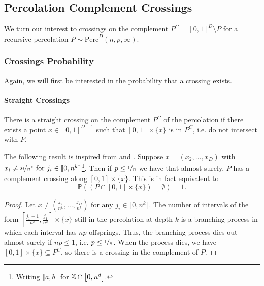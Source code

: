 
\subsection{Percolation Complement Crossings}
We turn our interest to crossings on the complement $P^C = \left[ 0,1 \right]^D \setminus P$ for a recursive percolation $P \sim \text{Perc}^D(n,p,\infty)$.

\subsubsection{Crossings Probability}
Again, we will first be interested in the probability that a crossing exists.

\paragraph{Straight Crossings}
There is a straight crossing on the complement $P^C$ of the percolation if there exists a point $x \in \left[ 0,1 \right]^{D-1}$ such that $\left[ 0,1 \right] \times \{ x \}$  is in $P^C$, i.e. do not intersect with $P$.

The following result is inspired from \cite[p.309 b.(1)]{Chayes_1988} and \cite[p.215]{Mandelbrot_1982}.
Suppose $x = (x_2,\dots,x_D)$ with $x_i \neq \nicefrac{j_i}{n^k} \text{ for } j_i \in \llbracket 0,n^k \rrbracket$\footnote{Writing $\llbracket a,b \rrbracket$ for $\mathbb{Z} \cap \left[ 0,n^d \right]$.}.
Then if $p \leq \nicefrac{1}{n}$ we have that almost surely, $P$ has a complement crossing along $\left[ 0,1 \right] \times \{ x \}$.
This is in fact equivalent to 
$$\mathbb{P}\left( \left( P \cap \left[ 0,1 \right] \times \{ x \} \right) = \emptyset \right) = 1 .$$
\begin{proof}
	Let $x \neq \left( \frac{j_2}{n^k},\dots,\frac{j_D}{n^k} \right) \text{ for any } j_i \in \llbracket 0,n^k \rrbracket$.
	The number of intervals of the form $\left[ \frac{j_1-1}{n^k},\frac{j_1}{n^k} \right] \times \{ x \}$ still in the percolation at depth $k$ is a branching process in which each interval has $np$ offsprings.
	Thus, the branching process dies out almost surely if $np \leq 1$, i.e. $p \leq \nicefrac{1}{n}$.
	When the process dies, we have $\left[ 0,1 \right] \times \{ x \} \subseteq P^C$, so there is a crossing in the complement of $P$.
\end{proof}

